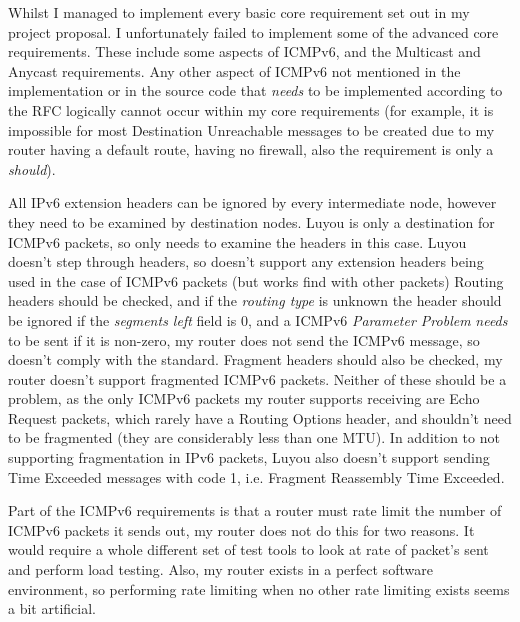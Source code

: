 \documentclass[12pt,a4paper,twoside,openright]{report}
\begin{document}
\bigskip

Whilst I managed to implement every basic core requirement set out in my project proposal. I unfortunately failed to implement some of the advanced core requirements. These include some aspects of ICMPv6, and the Multicast and Anycast requirements. Any other aspect of ICMPv6 not mentioned in the implementation or in the source code that \textit{needs} to be implemented according to the RFC logically cannot occur within my core requirements (for example, it is impossible for most Destination Unreachable messages to be created due to my router having a default route, having no firewall, also the requirement is only a \textit{should}).

\bigskip

All IPv6 extension headers can be ignored by every intermediate node, however they need to be examined by destination nodes.  Luyou is only a destination for ICMPv6  packets, so only needs to examine the headers in this case. Luyou doesn't step through headers, so doesn't support any extension headers being used in the case of ICMPv6 packets (but works find with other packets) Routing headers should be checked, and if the \textit{routing type} is unknown the header should be ignored if the \textit{segments left} field is 0, and a ICMPv6 \textit{Parameter Problem} \textit{needs} to be sent if it is non-zero, my router does not send the ICMPv6 message, so doesn't comply with the standard. Fragment headers should also be checked, my router doesn't support fragmented ICMPv6 packets.  Neither of these should be a problem, as the only ICMPv6 packets my router supports receiving are Echo Request packets, which rarely have a Routing Options header, and shouldn't need to be fragmented (they are considerably less than one MTU). In addition to not supporting fragmentation in IPv6 packets, Luyou also doesn't support sending Time Exceeded messages with code 1, i.e. Fragment Reassembly Time Exceeded. 

\bigskip

Part of the ICMPv6 requirements is that a router must rate limit the number of ICMPv6 packets it sends out, my router does not do this for two reasons.  It would require a whole different set of test tools to look at rate of packet's sent and perform load testing.  Also, my router exists in a perfect software environment, so performing rate limiting when no other rate limiting exists seems a bit artificial.

\bigskip
\end{document}
